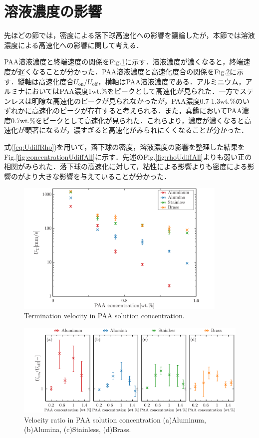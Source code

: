 \section{溶液濃度の影響}

先ほどの節では，密度による落下球高速化への影響を議論したが，本節では溶液濃度による高速化への影響に関して考える．

PAA溶液濃度と終端速度の関係をFig.\ref{fig:concentrationUT}に示す．溶液濃度が濃くなると，終端速度が遅くなることが分かった．PAA溶液濃度と高速化度合の関係をFig.\ref{fig:concentrationUdiff}に示す．縦軸は高速化度合$U_\text{on}/U_\text{off}$，横軸はPAA溶液濃度である．アルミニウム，アルミナにおいてはPAA濃度1wt.\%をピークとして高速化が見られた．一方でステンレスは明瞭な高速化のピークが見られなかったが，PAA濃度0.7-1.3wt.\%のいずれかに高速化のピークが存在すると考えられる．また，真鍮においてPAA濃度0.7wt.\%をピークとして高速化が見られた．これらより，濃度が濃くなると高速化が顕著になるが，濃すぎると高速化がみられにくくなることが分かった．

式(\ref{eq:UdiffRho})を用いて，落下球の密度，溶液濃度の影響を整理した結果をFig.\ref{fig:concentrationUdiffAll}に示す．先述のFig.\ref{fig:rhoUdiffAll}よりも弱い正の相関がみられた．落下球の高速化に対して，粘性による影響よりも密度による影響のがより大きな影響を与えていることが分かった．

\begin{figure}[ht]
    \centering
    \includegraphics[width=0.9\textwidth]{./5-Results/concentration/concentrationUT.png}
    \caption{Termination velocity in PAA solution concentration.}
    \label{fig:concentrationUT}
\end{figure}

\begin{figure}[ht]
    \centering
    \includegraphics[width=1.0\textwidth]{./5-Results/concentration/concentrationUdiff.png}
    \caption{Velocity ratio in PAA solution concentration (a)Aluminum, (b)Alumina, (c)Stainless, (d)Brass.}
    \label{fig:concentrationUdiff}
\end{figure}

